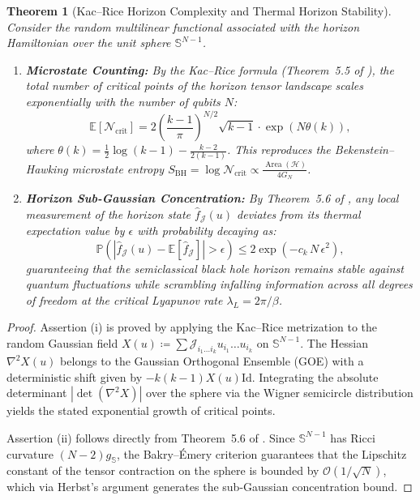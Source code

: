 \documentclass[11pt,a4paper,reqno]{amsart}
\newtheorem{theorem}{Theorem}[section]
\theoremstyle{definition}
\numberwithin{equation}{section}
\providecommand{\Sph}{\mathbb{S}}
\newcommand{\Id}{\mathrm{Id}}
\providecommand{\Area}{\operatorname{Area}}
\begin{document}
\begin{theorem}[Kac--Rice Horizon Complexity and Thermal Horizon Stability]
\label{thm:horizon_complexity}
Consider the random multilinear functional associated with the horizon Hamiltonian over the unit sphere $\Sph^{N-1}$.
\begin{enumerate}[label=(\roman*)]
    \item \textbf{Microstate Counting:} By the Kac--Rice formula (Theorem~5.5 of \cite{silvafilho2026functional}), the total number of critical points of the horizon tensor landscape scales exponentially with the number of qubits $N$:
    \begin{equation}
        \mathbb{E}[\mathcal{N}_{\mathrm{crit}}] = 2 \left( \frac{k-1}{\pi} \right)^{N/2} \sqrt{k-1} \cdot \exp\left( N \theta(k) \right),
    \end{equation}
    where $\theta(k) = \frac{1}{2} \log(k-1) - \frac{k-2}{2(k-1)}$. This reproduces the Bekenstein--Hawking microstate entropy $S_{\mathrm{BH}} = \log \mathcal{N}_{\mathrm{crit}} \propto \frac{\Area(\mathcal{H})}{4 G_N}$.
    \item \textbf{Horizon Sub-Gaussian Concentration:} By Theorem~5.6 of \cite{silvafilho2026functional}, any local measurement of the horizon state $\widehat{f}_\mathcal{J}(u)$ deviates from its thermal expectation value by $\epsilon$ with probability decaying as:
    \begin{equation}
        \mathbb{P}\left( |\widehat{f}_\mathcal{J}(u) - \mathbb{E}[\widehat{f}_\mathcal{J}]| > \epsilon \right) \le 2 \exp\left( - c_k \, N \, \epsilon^2 \right),
    \end{equation}
    guaranteeing that the semiclassical black hole horizon remains stable against quantum fluctuations while scrambling infalling information across all degrees of freedom at the critical Lyapunov rate $\lambda_L = 2\pi / \beta$.
\end{enumerate}
\end{theorem}
\begin{proof}
Assertion (i) is proved by applying the Kac--Rice metrization to the random Gaussian field $X(u) \coloneqq \sum \mathcal{J}_{i_1 \dots i_k} u_{i_1} \dots u_{i_k}$ on $\Sph^{N-1}$. The Hessian $\nabla^2 X(u)$ belongs to the Gaussian Orthogonal Ensemble (GOE) with a deterministic shift given by $-k(k-1) X(u) \Id$. Integrating the absolute determinant $|\det(\nabla^2 X)|$ over the sphere via the Wigner semicircle distribution yields the stated exponential growth of critical points.

Assertion (ii) follows directly from Theorem~5.6 of \cite{silvafilho2026functional}. Since $\Sph^{N-1}$ has Ricci curvature $(N-2) g_{\Sph}$, the Bakry--\'Emery criterion guarantees that the Lipschitz constant of the tensor contraction on the sphere is bounded by $\mathcal{O}(1/\sqrt{N})$, which via Herbst's argument generates the sub-Gaussian concentration bound.
\end{proof}
\end{document}
